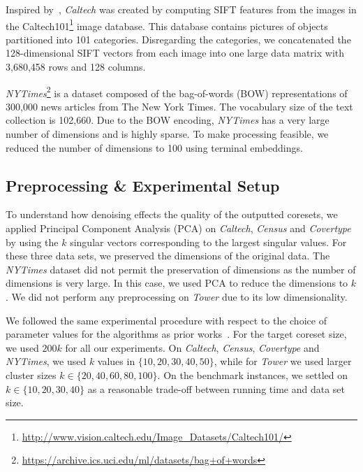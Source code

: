 

Inspired by~\cite{FGSSS13}, \textit{Caltech} was created by computing SIFT features from the images in the Caltech101\footnote{\url{http://www.vision.caltech.edu/Image_Datasets/Caltech101/}} image database. This database contains pictures of objects partitioned into 101 categories. Disregarding the categories, we concatenated the 128-dimensional SIFT vectors from each image into one large data matrix with 3,680,458 rows and 128 columns. 

\textit{NYTimes}\footnote{\url{https://archive.ics.uci.edu/ml/datasets/bag+of+words}} is a dataset composed of the bag-of-words (BOW) representations of 300,000 news articles from The New York Times. The vocabulary size of the text collection is 102,660. Due to the BOW encoding, \textit{NYTimes} has a very large number of dimensions and is highly sparse. To make processing feasible, we reduced the number of dimensions to 100 using terminal embeddings.

\subsection{Preprocessing \& Experimental Setup}
To understand how denoising effects the quality of the outputted coresets, we applied Principal Component Analysis (PCA) on \textit{Caltech}, \textit{Census} and \textit{Covertype} by using the $k$ singular vectors corresponding to the largest singular values. For these three data sets, we preserved the dimensions of the original data.  
The \textit{NYTimes} dataset did not permit the preservation of dimensions as the number of dimensions is very large. In this case, we used PCA to reduce the dimensions to $k$.
We did not perform any preprocessing on \textit{Tower} due to its low dimensionality.

We followed the same experimental procedure with respect to the choice of parameter values for the algorithms as prior works~\cite{AckermannMRSLS12, FGSSS13}. For the target coreset size, we used $200k$ for all our experiments. On \textit{Caltech}, \textit{Census},  \textit{Covertype} and \textit{NYTimes}, we used $k$ values in $\{10, 20, 30, 40, 50\}$, while for \textit{Tower} we used larger cluster sizes $k \in \{20, 40, 60, 80, 100\}$. On the benchmark instances, we settled on $k \in \{10, 20, 30, 40\}$ as a reasonable trade-off between running time and data set size.


